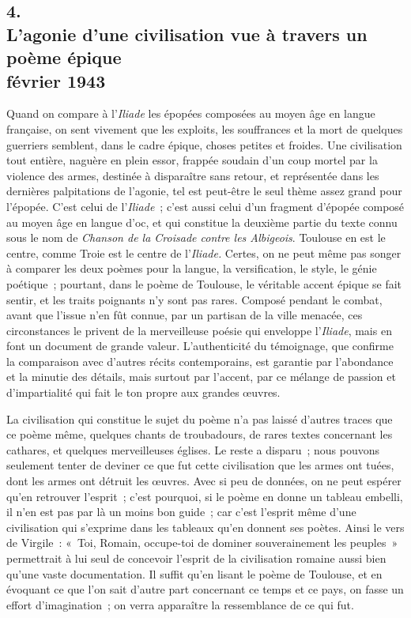 \documentclass[french,twoside]{book} %
\begin{document}
\subsection[4. L’agonie d’une civilisation vue à travers un poème épique, février 1943]{4. \\
L’agonie d’une civilisation vue à travers un poème épique \\
février 1943}
\noindent \par
Quand on compare à l'{\itshape Iliade} les épopées composées au moyen âge en langue française, on sent vivement que les exploits, les souffrances et la mort de quelques guerriers semblent, dans le cadre épique, choses petites et froides. Une civilisation tout entière, naguère en plein essor, frappée soudain d'un coup mortel par la violence des armes, destinée à disparaître sans retour, et représentée dans les dernières palpitations de l'agonie, tel est peut-être le seul thème assez grand pour l'épopée. C'est celui de l'{\itshape Iliade} ; c'est aussi celui d'un fragment d'épopée composé au moyen âge en langue d'oc, et qui constitue la deuxième partie du texte connu sous le nom de {\itshape Chanson de la Croisade contre les Albigeois}. Toulouse en est le centre, comme Troie est le centre de l'{\itshape Iliade.} Certes, on ne peut même pas songer à comparer les deux poèmes pour la langue, la versification, le style, le génie poétique ; pourtant, dans le poème de Toulouse, le véritable accent épique se fait sentir, et les traits poignants n'y sont pas rares. Composé pendant le combat, avant que l'issue n'en fût connue, par un partisan de la ville menacée, ces circonstances le privent de la merveil­leuse poésie qui enveloppe l'{\itshape Iliade}, mais en font un document de grande valeur. L'authenticité du témoignage, que confirme la comparaison avec d'au­tres récits contemporains, est garantie par l'abondance et la minutie des détails, mais surtout par l'accent, par ce mélange de passion et d'impartialité qui fait le ton propre aux grandes œuvres.\par
La civilisation qui constitue le sujet du poème n'a pas laissé d'autres traces que ce poème même, quelques chants de troubadours, de rares textes concer­nant les cathares, et quelques merveilleuses églises. Le reste a disparu ; nous pouvons seulement tenter de deviner ce que fut cette civilisation que les armes ont tuées, dont les armes ont détruit les œuvres. Avec si peu de données, on ne peut espérer qu'en retrouver l'esprit ; c'est pourquoi, si le poème en donne un tableau embelli, il n'en est pas par là un moins bon guide ; car c'est l'esprit même d'une civilisation qui s'exprime dans les tableaux qu'en donnent ses poètes. Ainsi le vers de Virgile : « Toi, Romain, occupe-toi de dominer souve­rainement les peuples » permettrait à lui seul de concevoir l'esprit de la civilisation romaine aussi bien qu'une vaste documentation. Il suffit qu'en lisant le poème de Toulouse, et en évoquant ce que l'on sait d'autre part con­cernant ce temps et ce pays, on fasse un effort d'imagination ; on verra apparaître la ressemblance de ce qui fut.\par
\end{document}
